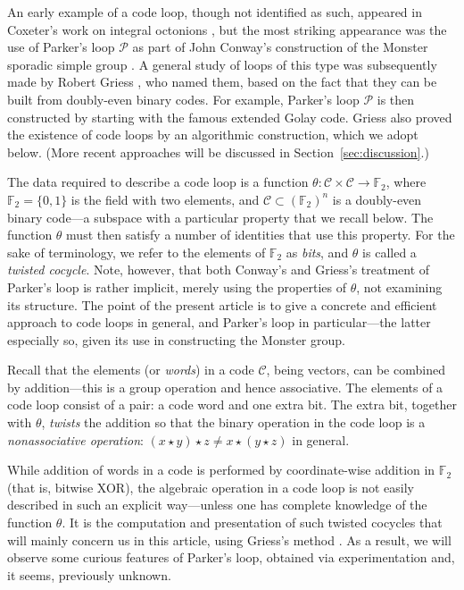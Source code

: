 \documentclass{article}
\theoremstyle{plain}
\theoremstyle{definition}
\def \cC {\mathcal{C}}
\def \cP {\mathcal{P}}
\def \FF {\mathbb{F}}
\begin{document}
An early example of a code loop, though not identified as such, appeared in Coxeter's work on integral octonions \cite{Coxeter}, but the most striking appearance was the use of Parker's loop $\cP$ as part of John Conway's construction of the Monster sporadic simple group \cite{Conway}. 
A general study of loops of this type was subsequently made by Robert Griess \cite{Griess}, who named them, based on the fact that they can be built from doubly-even binary codes. 
For example, Parker's loop $\cP$ is then constructed by starting with the famous extended Golay code.
Griess also proved the existence of code loops by an algorithmic construction, which we adopt below.
(More recent approaches will be discussed in Section~\ref{sec:discussion}.)

The data required to describe a code loop is a function $\theta\colon \cC\times \cC \to \FF_2$, where $\FF_2 = \{0,1\}$ is the field with two elements, and $\cC\subset (\FF_2)^n$ is a doubly-even binary code---a subspace with a particular property that we recall below. 
The function $\theta$ must then satisfy a number of identities that use this property.
For the sake of terminology, we refer to the elements of $\FF_2$ as \emph{bits}, and $\theta$ is called a \emph{twisted cocycle}.
Note, however, that both Conway's and Griess's treatment of Parker's loop is rather implicit, merely using the properties of $\theta$, not examining its structure. 
The point of the present article is to give a concrete and efficient approach to code loops in general, and Parker's loop in particular---the latter especially so, given its use in constructing the Monster group.

Recall that the elements (or \emph{words}) in a code $\cC$, being vectors, can be combined by addition---this is a group operation and hence associative. 
The elements of a code loop consist of a pair: a code word and one extra bit.
The extra bit, together with $\theta$, \emph{twists} the addition so that the binary operation in the code loop is a \emph{nonassociative operation}: $(x\star y)\star z\not=x\star (y\star z)$ in general.

While addition of words in a code is performed by coordinate-wise addition in $\FF_2$ (that is, bitwise XOR), the algebraic operation in a code loop is not easily described in such an explicit way---unless one has complete knowledge of the function $\theta$.
It is the computation and presentation of such twisted cocycles that will mainly concern us in this article, using Griess's method \cite[proof of Theorem 10]{Griess}.
As a result, we will observe some curious features of Parker's loop, obtained via experimentation and, it seems, previously unknown.
\end{document}
